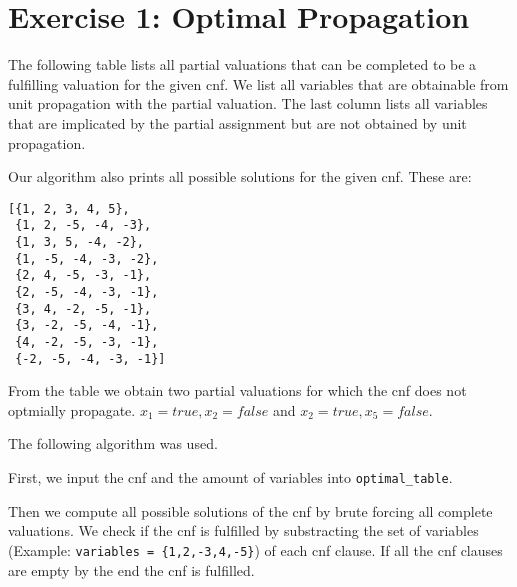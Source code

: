 \documentclass{base}
\begin{document}



\section*{Exercise 1: Optimal Propagation}
The following table lists all partial valuations that can be completed to be a fulfilling valuation for the given cnf.
We list all variables that are obtainable from unit propagation with the partial valuation.
The last column lists all variables that are implicated by the partial assignment but are not obtained by unit propagation.

Our algorithm also prints all possible solutions for the given cnf. These are:
\begin{lstlisting}
[{1, 2, 3, 4, 5}, 
 {1, 2, -5, -4, -3}, 
 {1, 3, 5, -4, -2}, 
 {1, -5, -4, -3, -2}, 
 {2, 4, -5, -3, -1}, 
 {2, -5, -4, -3, -1},
 {3, 4, -2, -5, -1}, 
 {3, -2, -5, -4, -1}, 
 {4, -2, -5, -3, -1}, 
 {-2, -5, -4, -3, -1}]
\end{lstlisting}


From the table we obtain two partial valuations for which the cnf does not optmially propagate. ${x_1 = true, x_2=false}$ and ${x_2 = true, x_5=false}$.

The following algorithm was used.

First, we input the cnf and the amount of variables into \verb|optimal_table|.

Then we compute all possible solutions of the cnf by brute forcing all complete valuations.
We check if the cnf is fulfilled by substracting the set of variables (Example: \verb|variables = {1,2,-3,4,-5}|) of each cnf clause. If all the cnf clauses are empty by the end the cnf is fulfilled.
\end{document}
